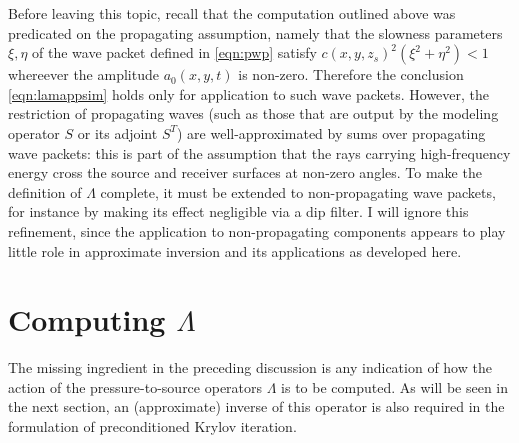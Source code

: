 \documentclass[georeport,12pt]{geophysics}
\begin{document}
Before leaving this topic, recall that the computation outlined above
was predicated on the propagating assumption, namely that the slowness
parameters $\xi,\eta$ of the wave packet defined in \ref{eqn:pwp}
satisfy $c(x,y,z_s)^2(\xi^2 + \eta^2) < 1$ whereever the amplitude
$a_0(x,y,t)$ is non-zero. Therefore the conclusion \ref{eqn:lamappsim}
holds only for application to such wave packets. However, the restriction of
propagating waves (such as those that are output by the modeling
operator $S$ or its adjoint $S^T$) are well-approximated by sums over
propagating wave packets: this is part of the assumption that the rays
carrying high-frequency energy cross the source and receiver surfaces
at non-zero angles. To make the definition of $\Lambda$ complete, it
must be extended to non-propagating wave packets, for instance by
making its effect negligible via a dip filter. I will ignore this refinement, since the
application to non-propagating components appears to play little role
in approximate inversion and its applications as developed here.

\section{Computing $\Lambda$}

The missing ingredient in the preceding discussion is any indication
of how the action of the pressure-to-source operators $\Lambda$ is to be
computed. As will be seen in the next section, an (approximate)
inverse of this operator is also required in the formulation of
preconditioned Krylov iteration. 
\end{document}

